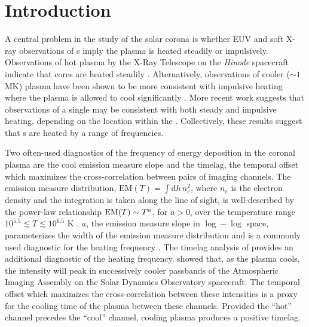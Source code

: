 \section{Introduction}\label{sec:introduction}

A central problem in the study of the solar corona is whether EUV and soft X-ray observations of \AR s imply the plasma is heated steadily or impulsively. Observations of hot plasma by the X-Ray Telescope \citep[XRT,][]{golub_x-ray_2007} on the \textit{Hinode} spacecraft \citep{kosugi_hinode_2007} indicate that \AR{} cores are heated steadily \citep[e.g.][]{warren_constraints_2011,winebarger_using_2011}. Alternatively, observations of cooler ($\sim1$ MK) plasma have been shown to be more consistent with impulsive heating where the plasma is allowed to cool significantly \citep[e.g][]{winebarger_evolving_2003,mulu-moore_determining_2011,ugarte-urra_investigation_2006,viall_patterns_2011,viall_evidence_2012}. More recent work \citep{del_zanna_evolution_2015,bradshaw_patterns_2016} suggests that observations of a single \AR{} may be consistent with both steady and impulsive heating, depending on the location within the \AR{}. Collectively, these results suggest that \AR s are heated by a range of frequencies.

Two often-used diagnostics of the frequency of energy deposition in the coronal plasma are the cool emission measure slope and the timelag, the temporal offset which maximizes the cross-correlation between pairs of imaging channels. The emission measure distribution, $\mathrm{EM}(T)=\int\mathrm{d}h\,n_e^2$, where $n_e$ is the electron density and the integration is taken along the line of sight, is well-described by the power-law relationship $\textup{EM}(T)\sim T^a$, for $a>0$, over the temperature range $10^{5.5}\lesssim T\lesssim10^{6.5}$ K \citep{jordan_structure_1975,jordan_structure_1976}. $a$, the emission measure slope in $\log-\log$ space, parameterizes the width of the emission measure distribution and is a commonly used diagnostic for the heating frequency \citep[e.g.][]{tripathi_emission_2011,winebarger_using_2011,warren_constraints_2011,mulu-moore_can_2011,bradshaw_diagnosing_2012,schmelz_cold_2012,reep_diagnosing_2013,del_zanna_evolution_2015}. The timelag analysis of \citet{viall_evidence_2012} provides an additional diagnostic of the heating frequency. \citet{viall_patterns_2011} showed that, as the plasma cools, the intensity will peak in successively cooler passbands of the Atmospheric Imaging Assembly \citep[AIA,][]{lemen_atmospheric_2012} on the Solar Dynamics Observatory \citep[SDO,][]{pesnell_solar_2012} spacecraft. The temporal offset which maximizes the cross-correlation between these intensities is a proxy for the cooling time of the plasma between these channels. Provided the ``hot'' channel precedes the ``cool'' channel, cooling plasma produces a positive timelag.

